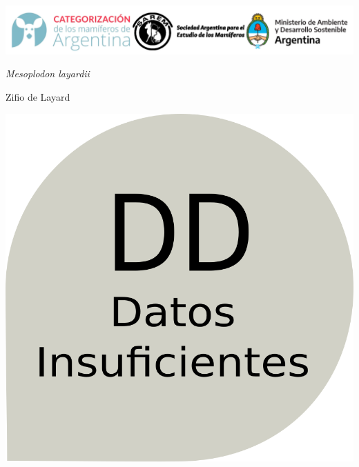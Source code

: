 \documentclass[
  x11names]{article}
\author{}
\date{\vspace{-2.5em}Fecha de creación: 03 April, 2023}
\begin{document}
\setmainfont{Arial}
\setsansfont{Arial}
\setmonofont{Arial}

\newcommand\invisiblesection[1]{%
  \refstepcounter{section}%
  \addcontentsline{toc}{section}{\protect\numberline{\thesection}#1}%
  \sectionmark{#1}}


%
\vspace{-0.4cm}

\includegraphics[width=1\linewidth]{images/Base_info/logo}

\vspace{1cm}

\begin{minipage}{0.7\textwidth}
\vspace{0.3cm}
\fontsize{20}{24}\selectfont\textit{Mesoplodon layardii}

\vspace{0.3cm}
\fontsize{30}{36}\selectfont Zifio de Layard
\end{minipage}
\hspace{0.05\textwidth}
\begin{minipage}{0.25\textwidth}
\includegraphics[width=\textwidth]{images/dd.png}
\end{minipage}
\end{document}
